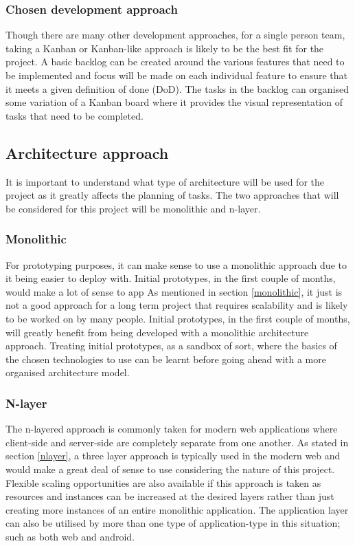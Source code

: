 \subsubsection*{Chosen development approach}
Though there are many other development approaches, for a single person team, taking a Kanban or Kanban-like approach is likely to be the best
fit for the project.
A basic backlog can be created around the various features that need to be implemented and focus will be made on each individual feature to ensure
that it meets a given definition of done (DoD). 
The tasks in the backlog can organised some variation of a Kanban board where it provides the visual representation of tasks that need to be
completed. 

\subsection{Architecture approach}
It is important to understand what type of architecture will be used for the project as it greatly affects the planning of tasks.
The two approaches that will be considered for this project will be monolithic and n-layer.

\subsubsection*{Monolithic}
For prototyping purposes, it can make sense to use a monolithic approach due to it being easier to deploy with.
Initial prototypes, in the first couple of months, would make a lot of sense to app
As mentioned in section \ref{monolithic}, it just is not a good approach for a long term project that requires scalability and is likely
to be worked on by many people.
Initial prototypes, in the first couple of months, will greatly benefit from being developed with a monolithic architecture approach.
Treating initial prototypes, as a sandbox of sort, where the basics of the chosen technologies to use can be learnt before going
ahead with a more organised architecture model.

\subsubsection*{N-layer}
The n-layered approach is commonly taken for modern web applications where client-side and server-side are completely separate
from one another. As stated in section \ref{nlayer}, a three layer approach is typically used in the modern web and would make a great
deal of sense to use considering the nature of this project.
Flexible scaling opportunities are also available if this approach is taken as resources and instances can be increased at the desired
layers rather than just creating more instances of an entire monolithic application.
The application layer can also be utilised by more than one type of application-type in this situation; such as both web and android.
 

